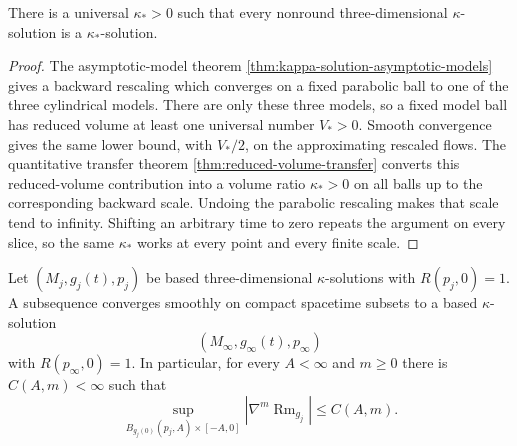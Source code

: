 \begin{proposition}
\label{prop:universal-nonround-kappa}
\notready
There is a universal $\kappa_*>0$ such that every nonround
three-dimensional $\kappa$-solution is a $\kappa_*$-solution.
\end{proposition}

\begin{proof}
The asymptotic-model theorem
\ref{thm:kappa-solution-asymptotic-models} gives a backward rescaling which
converges on a fixed parabolic ball to one of the three cylindrical models.
There are only these three models, so a fixed model ball has reduced
volume at least one universal number $V_*>0$.  Smooth convergence gives the
same lower bound, with $V_*/2$, on the approximating rescaled flows.
The quantitative transfer theorem \ref{thm:reduced-volume-transfer} converts
this reduced-volume contribution into a volume ratio
$\kappa_*>0$ on all balls up to the corresponding backward scale.  Undoing
the parabolic rescaling makes that scale tend to infinity.  Shifting an
arbitrary time to zero repeats the argument on every slice, so the same
$\kappa_*$ works at every point and every finite scale.
\end{proof}

\begin{theorem}
\label{thm:kappa-solution-compactness}
\notready
Let $(M_j,g_j(t),p_j)$ be based three-dimensional $\kappa$-solutions with
$R(p_j,0)=1$.  A subsequence converges smoothly on compact spacetime
subsets to a based $\kappa$-solution
\[
 (M_\infty,g_\infty(t),p_\infty)
\]
with $R(p_\infty,0)=1$.
In particular, for every $A<\infty$ and $m\ge0$ there is $C(A,m)<\infty$
such that
\[
 \sup_{B_{g_j(0)}(p_j,A)\times[-A,0]}
 |\nabla^m\operatorname{Rm}_{g_j}|\le C(A,m).
\]
\end{theorem}

